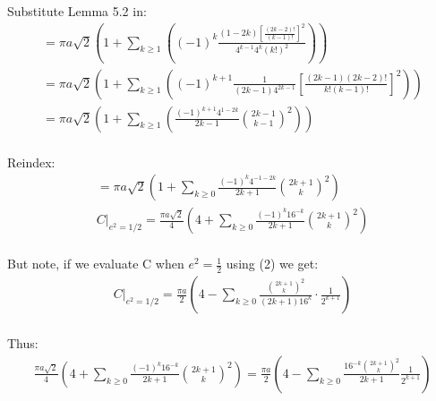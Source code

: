 \documentclass{article}
\begin{document}
Substitute Lemma 5.2 in:
\begin{equation*}
\begin{split}
	= \pi a\sqrt{2} \left( 1 +
	\sum_{k\geq 1}\left( (-1)^k\frac{(1-2k)\left[\frac{(2k-2)!}{(k-1)!}\right]^2}{4^{k-1}4^k(k!)^2}\right)\right)\\
	= \pi a\sqrt{2} \left( 1 +
	\sum_{k\geq 1}\left( (-1)^{k+1}\frac{1}{(2k-1)4^{2k-1}}\left[\frac{(2k-1)(2k-2)!}{k!(k-1)!}\right]^2\right)\right)\\
	= \pi a\sqrt{2} \left( 1 +
	\sum_{k\geq 1}\left( \frac{(-1)^{k+1}4^{1-2k}}{2k-1}{{2k-1}\choose{k-1}}^2\right)\right)\\
\end{split}
\end{equation*}

Reindex:
\begin{equation*}
\begin{split}
	= \pi a\sqrt{2} \left( 1 +
	\sum_{k\geq 0} \frac{(-1)^{k}4^{-1-2k}}{2k+1}{{2k+1}\choose k}^2\right)\\
	C\biggr\rvert_{e^2=1/2}  = \frac{\pi a\sqrt{2}}{4} \left( 4 +
	\sum_{k\geq 0} \frac{(-1)^{k}16^{-k}}{2k+1}{{2k+1}\choose k}^2\right)\\
\end{split}
\end{equation*}

But note, if we evaluate C when $e^2 = \frac{1}{2}$ using (2) we get:
\begin{equation*}
\begin{split}
	C\biggr\rvert_{e^2=1/2} = \frac{\pi a}{2}\left(4-\sum_{k\geq 0}\frac{{{2k+1}\choose k}^2}{(2k+1)16^k}\cdot\frac{1}{2^{k+1}}\right)\\
\end{split}
\end{equation*}

Thus:
\begin{equation*}
\begin{split}
	\frac{\pi a\sqrt{2}}{4} \left( 4 +
	\sum_{k\geq 0} \frac{(-1)^{k}16^{-k}}{2k+1}{{2k+1}\choose k}^2\right)
	= \frac{\pi a}{2}\left(4-\sum_{k\geq 0}\frac{16^{-k}{{2k+1}\choose k}^2}{2k+1}\frac{1}{2^{k+1}}\right)\\
\end{split}
\end{equation*}
\end{document}
